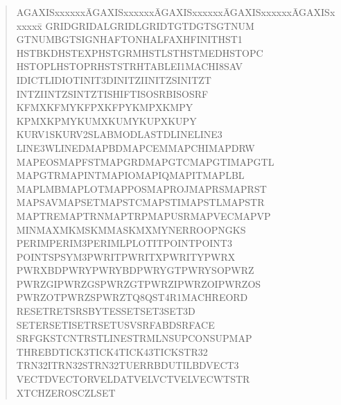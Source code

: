 \begin{quote}
\vspace {-6mm}

\begin{tabbing}
AGAXISxxxxxx\=AGAXISxxxxxx\=AGAXISxxxxxx\=AGAXISxxxxxx\=AGAXISxxxxxx\=\kill
GRID\>GRIDAL\>GRIDL\>GRIDT\>GTDGTS\>GTNUM\\
GTNUMB\>GTSIGN\>HAFTON\>HALFAX\>HFINIT\>HST1\\
HSTBKD\>HSTEXP\>HSTGRM\>HSTLST\>HSTMED\>HSTOPC\\
HSTOPL\>HSTOPR\>HSTSTR\>HTABLE\>I1MACH\>I8SAV\\
IDICTL\>IDIOT\>INIT3D\>INITZI\>INITZS\>INITZT\\
INTZI\>INTZS\>INTZT\>ISHIFT\>ISOSRB\>ISOSRF\\
KFMX\>KFMY\>KFPX\>KFPY\>KMPX\>KMPY\\
KPMX\>KPMY\>KUMX\>KUMY\>KUPX\>KUPY\\
KURV1S\>KURV2S\>LABMOD\>LASTD\>LINE\>LINE3\\
LINE3W\>LINED\>MAPBD\>MAPCEM\>MAPCHI\>MAPDRW\\
MAPEOS\>MAPFST\>MAPGRD\>MAPGTC\>MAPGTI\>MAPGTL\\
MAPGTR\>MAPINT\>MAPIO\>MAPIQ\>MAPIT\>MAPLBL\\
MAPLMB\>MAPLOT\>MAPPOS\>MAPROJ\>MAPRS\>MAPRST\\
MAPSAV\>MAPSET\>MAPSTC\>MAPSTI\>MAPSTL\>MAPSTR\\
MAPTRE\>MAPTRN\>MAPTRP\>MAPUSR\>MAPVEC\>MAPVP\\
MINMAX\>MKMSK\>MMASK\>MXMY\>NERRO\>OPNGKS\\
PERIM\>PERIM3\>PERIML\>PLOTIT\>POINT\>POINT3\\
POINTS\>PSYM3\>PWRIT\>PWRITX\>PWRITY\>PWRX\\
PWRXBD\>PWRY\>PWRYBD\>PWRYGT\>PWRYSO\>PWRZ\\
PWRZGI\>PWRZGS\>PWRZGT\>PWRZI\>PWRZOI\>PWRZOS\\
PWRZOT\>PWRZS\>PWRZT\>Q8QST4\>R1MACH\>REORD\\
RESET\>RETSR\>SBYTES\>SET\>SET3\>SET3D\\
SETER\>SETI\>SETR\>SETUSV\>SRFABD\>SRFACE\\
SRFGK\>STCNTR\>STLINE\>STRMLN\>SUPCON\>SUPMAP\\
THREBD\>TICK3\>TICK4\>TICK43\>TICKS\>TR32\\
TRN32I\>TRN32S\>TRN32T\>UERRBD\>UTILBD\>VECT3\\
VECTD\>VECTOR\>VELDAT\>VELVCT\>VELVEC\>WTSTR\\
XTCH\>ZEROSC\>ZLSET
\end{tabbing}
\end{quote}
\normalsize


